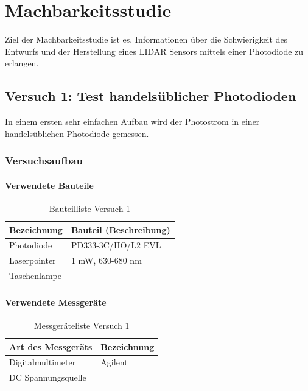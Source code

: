 \chapter{Machbarkeitsstudie}\label{chap:machbarkeitsstudie}
Ziel der Machbarkeitsstudie ist es, Informationen über die Schwierigkeit des Entwurfs und der Herstellung eines \ac{LIDAR} Sensors mittels einer Photodiode zu erlangen. 

\section{Versuch 1: Test handelsüblicher Photodioden}
In einem ersten sehr einfachen Aufbau wird der Photostrom in einer handelsüblichen Photodiode gemessen.
\subsection{Versuchsaufbau}
\subsubsection{Verwendete Bauteile}

\begin{table}[H]
	\centering
	\caption{Bauteilliste Versuch 1}
	\begin{tabular}{|l|l|}
		\hline
		\textbf{Bezeichnung} & \textbf{Bauteil (Beschreibung)}
		\\\hline
		Photodiode & PD333-3C/HO/L2 EVL
		\\\hline
		Laserpointer & 1 mW, 630-680 nm
		\\\hline
		Taschenlampe & 
		\\\hline
	\end{tabular}
\end{table}

\subsubsection{Verwendete Messgeräte}
\begin{table}[H]
	\centering
	\caption{Messgeräteliste Versuch 1}
	\begin{tabular}{|l|l|}
		\hline
		\textbf{Art des Messgeräts} & \textbf{Bezeichnung}
		\\\hline
		Digitalmultimeter & Agilent
		\\\hline
		DC Spannungsquelle &
		\\\hline
	\end{tabular}
\end{table}
